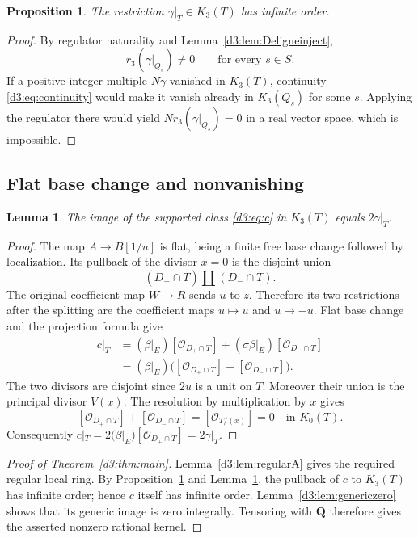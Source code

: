 \documentclass[11pt,a4paper]{amsart}
\numberwithin{equation}{section}
\newtheorem{lemma}[theorem]{Lemma}
\newtheorem{proposition}[theorem]{Proposition}
\theoremstyle{definition}
\theoremstyle{remark}
\newcommand{\Q}{\mathbf Q}
\newcommand{\OO}{\mathcal O}
\begin{document}
\begin{proposition}\label{d3:prop:infinite}
The restriction $\gamma|_T\in K_3(T)$ has infinite order.
\end{proposition}
\begin{proof}
By regulator naturality and Lemma~\ref{d3:lem:Deligneinject},
\[
r_3(\gamma|_{Q_s})\neq 0
\qquad\text{for every }s\in S.
\]
If a positive integer multiple $N\gamma$ vanished in $K_3(T)$, continuity \eqref{d3:eq:continuity} would make it vanish already in $K_3(Q_s)$ for some $s$. Applying the regulator there would yield $N r_3(\gamma|_{Q_s})=0$ in a real vector space, which is impossible.
\end{proof}

\subsection{Flat base change and nonvanishing}

\begin{lemma}\label{d3:lem:basechange}
The image of the supported class \eqref{d3:eq:c} in $K_3(T)$ equals $2\gamma|_T$.
\end{lemma}
\begin{proof}
The map $A\to B[1/u]$ is flat, being a finite free base change followed by localization. Its pullback of the divisor $x=0$ is the disjoint union
\[
(D_+\cap T)\amalg(D_-\cap T).
\]
The original coefficient map $W\to R$ sends $u$ to $z$. Therefore its two restrictions after the splitting are the coefficient maps $u\mapsto u$ and $u\mapsto -u$. Flat base change and the projection formula give
\begin{align*}
c|_T
&=(\beta|_E)[\OO_{D_+\cap T}]+(\sigma\beta|_E)[\OO_{D_-\cap T}]\\
&=(\beta|_E)\bigl([\OO_{D_+\cap T}]-[\OO_{D_-\cap T}]\bigr).
\end{align*}
The two divisors are disjoint since $2u$ is a unit on $T$. Moreover their union is the principal divisor $V(x)$. The resolution by multiplication by $x$ gives
\[
[\OO_{D_+\cap T}]+[\OO_{D_-\cap T}]
=[\OO_{T/(x)}]=0\quad\text{in }K_0(T).
\]
Consequently $c|_T=2(\beta|_E)[\OO_{D_+\cap T}]=2\gamma|_T$.
\end{proof}

\begin{proof}[Proof of Theorem~\ref{d3:thm:main}]
Lemma~\ref{d3:lem:regularA} gives the required regular local ring. By Proposition~\ref{d3:prop:infinite} and Lemma~\ref{d3:lem:basechange}, the pullback of $c$ to $K_3(T)$ has infinite order; hence $c$ itself has infinite order. Lemma~\ref{d3:lem:genericzero} shows that its generic image is zero integrally. Tensoring with $\Q$ therefore gives the asserted nonzero rational kernel.
\end{proof}
\end{document}
